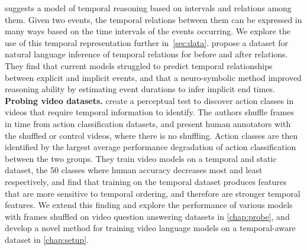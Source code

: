 \citet{allen1983interval} suggests a model of temporal reasoning based on
intervals and relations among them. Given two events, the temporal relations
between them can be expressed in many ways based on the time intervals of the
events occurring. We explore the use of this temporal representation further
in~\cref{sec:data}. \citet{zhou2021tracie} propose a dataset for natural
language inference of temporal relations for before and after relations. They
find that current models struggled to predict temporal relationships between
explicit and implicit events, and that a neuro-symbolic method improved 
reasoning ability by estimating event durations to infer implicit end times.\\



\noindent\textbf{Probing video datasets.}\hspace{0.2cm}
\citet{sevilla-lara2021temporal} create a perceptual test to discover action
classes in videos that require temporal information to identify. The authors
shuffle frames in time from action classification datasets, and present human
annotators with the shuffled or control videos, where there is no shuffling.
Action classes are then identified by the largest average performance
degradation of action classification between the two groups. They train video
models on a temporal and static dataset, the 50 classes where human accuracy
decreases most and least respectively, and find that training on the temporal
dataset produces features that are more sensitive to temporal ordering, and
therefore are stronger temporal features.
We extend this finding and explore the performance of various models with
frames shuffled on video question answering datasets in \cref{chap:probe}, and
develop a novel method for training video language models on a temporal-aware
dataset in \cref{chap:setup}.

%
%
%
%
